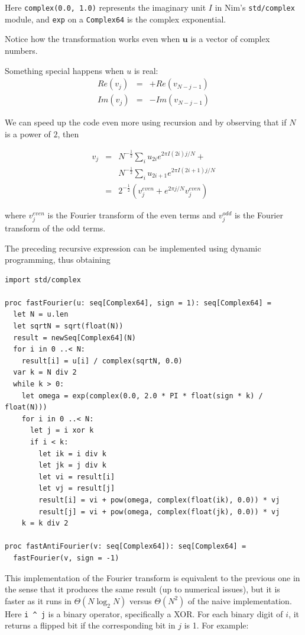 \documentclass[justified, sixbynine]{tufte-book}
\def\ft{\small\tt}
\theoremstyle{plain}%
\newtheorem * {corollary}{Corollary}
\theoremstyle{definition}
\theoremstyle{remark}
\newtheorem * {remark}{Remark}
\newtheorem * {note}{Note}
\begin{document}
\begin{fullwidth}
Here {\ft complex(0.0, 1.0)} represents the imaginary unit $I$ in Nim's {\ft std/complex} module, and {\ft exp} on a {\ft Complex64} is the complex exponential.

Notice how the transformation works even when $\mathbf{u}$ is a vector of complex numbers.

Something special happens when $u$ is real:
\begin{eqnarray}
Re(v_j) &=& +Re(v_{N-j-1}) \\
Im(v_j) &=& -Im(v_{N-j-1})
\end{eqnarray}

We can speed up the code even more using recursion and by observing that if $N$ is a power of $2$, then

\begin{eqnarray}
v_j &=& N^{-\frac12} \sum_i u_{2i} e^{2\pi I (2i)j/N} + \\
             &&  N^{-\frac12} \sum_i u_{2i+1} e^{2\pi I (2i+1)j/N} \\
             &=& 2^{-\frac12} ( v_j^{even} + e^{2\pi j/N} v_j^{even} )
\end{eqnarray}

where $v_j^{even}$ is the Fourier transform of the even terms and $v_j^{odd}$ is the Fourier transform of the odd terms.

The preceding recursive expression can be implemented using dynamic programming, thus obtaining


\begin{lstlisting}
import std/complex

proc fastFourier(u: seq[Complex64], sign = 1): seq[Complex64] =
  let N = u.len
  let sqrtN = sqrt(float(N))
  result = newSeq[Complex64](N)
  for i in 0 ..< N:
    result[i] = u[i] / complex(sqrtN, 0.0)
  var k = N div 2
  while k > 0:
    let omega = exp(complex(0.0, 2.0 * PI * float(sign * k) / float(N)))
    for i in 0 ..< N:
      let j = i xor k
      if i < k:
        let ik = i div k
        let jk = j div k
        let vi = result[i]
        let vj = result[j]
        result[i] = vi + pow(omega, complex(float(ik), 0.0)) * vj
        result[j] = vi + pow(omega, complex(float(jk), 0.0)) * vj
    k = k div 2

proc fastAntiFourier(v: seq[Complex64]): seq[Complex64] =
  fastFourier(v, sign = -1)
\end{lstlisting}

This implementation of the Fourier transform is equivalent to the previous one in the sense that it produces the same result (up to numerical issues), but it is faster as it runs in $\Theta(N \log_2 N)$ versus $\Theta(N^2)$ of the naive implementation. Here \verb!i ^ j!
is a binary operator, specifically a XOR. For each binary digit of $i$, it returns a flipped bit if the corresponding bit in $j$ is 1. For example:


\end{fullwidth}
\end{document}
